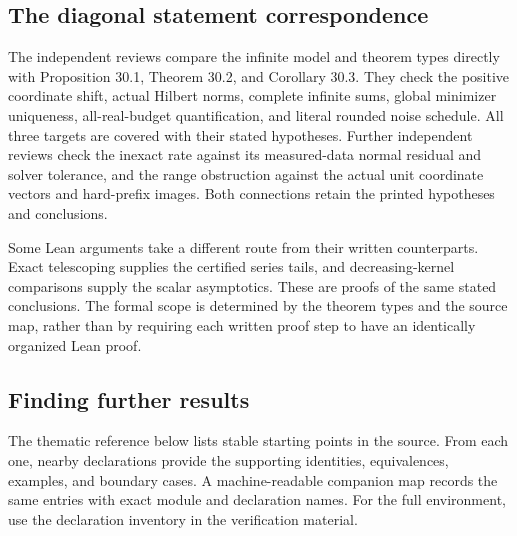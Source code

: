 \documentclass[11pt]{article}
\begin{document}
\subsection{The diagonal statement correspondence}
The independent reviews compare the infinite model and theorem types directly with Proposition 30.1, Theorem 30.2, and Corollary 30.3. They check the positive coordinate shift, actual Hilbert norms, complete infinite sums, global minimizer uniqueness, all-real-budget quantification, and literal rounded noise schedule. All three targets are covered with their stated hypotheses. Further independent reviews check the inexact rate against its measured-data normal residual and solver tolerance, and the range obstruction against the actual unit coordinate vectors and hard-prefix images. Both connections retain the printed hypotheses and conclusions.

Some Lean arguments take a different route from their written counterparts. Exact telescoping supplies the certified series tails, and decreasing-kernel comparisons supply the scalar asymptotics. These are proofs of the same stated conclusions. The formal scope is determined by the theorem types and the source map, rather than by requiring each written proof step to have an identically organized Lean proof.

\subsection{Finding further results}
The thematic reference below lists stable starting points in the source. From each one, nearby declarations provide the supporting identities, equivalences, examples, and boundary cases. A machine-readable companion map records the same entries with exact module and declaration names. For the full environment, use the declaration inventory in the verification material.

\end{document}
